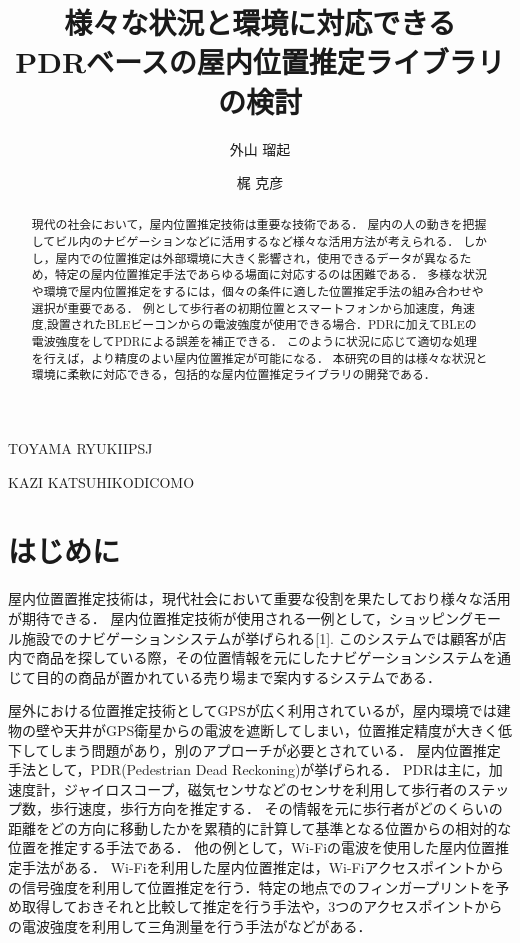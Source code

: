 \documentclass[Japanese]{dicomopapers}
\begin{document}
\title{様々な状況と環境に対応できる\\PDRベースの屋内位置推定ライブラリの検討}


\author{外山 瑠起}{TOYAMA RYUKI}{IPSJ}
\author{梶 克彦}{KAZI KATSUHIKO}{DICOMO}

\begin{abstract}
	現代の社会において，屋内位置推定技術は重要な技術である．
	屋内の人の動きを把握してビル内のナビゲーションなどに活用するなど様々な活用方法が考えられる．
	しかし，屋内での位置推定は外部環境に大きく影響され，使用できるデータが異なるため，特定の屋内位置推定手法であらゆる場面に対応するのは困難である．
	多様な状況や環境で屋内位置推定をするには，個々の条件に適した位置推定手法の組み合わせや選択が重要である．
	例として歩行者の初期位置とスマートフォンから加速度，角速度,設置されたBLEビーコンからの電波強度が使用できる場合．PDRに加えてBLEの電波強度をしてPDRによる誤差を補正できる．
	このように状況に応じて適切な処理を行えば，より精度のよい屋内位置推定が可能になる．
	本研究の目的は様々な状況と環境に柔軟に対応できる，包括的な屋内位置推定ライブラリの開発である．
\end{abstract}

\maketitle

\section{はじめに}
屋内位置置推定技術は，現代社会において重要な役割を果たしており様々な活用が期待できる．
屋内位置推定技術が使用される一例として，ショッピングモール施設でのナビゲーションシステムが挙げられる[1].
このシステムでは顧客が店内で商品を探している際，その位置情報を元にしたナビゲーションシステムを通じて目的の商品が置かれている売り場まで案内するシステムである．

屋外における位置推定技術としてGPSが広く利用されているが，屋内環境では建物の壁や天井がGPS衛星からの電波を遮断してしまい，位置推定精度が大きく低下してしまう問題があり，別のアプローチが必要とされている．
屋内位置推定手法として，PDR(Pedestrian Dead Reckoning)が挙げられる．
PDRは主に，加速度計，ジャイロスコープ，磁気センサなどのセンサを利用して歩行者のステップ数，歩行速度，歩行方向を推定する．
その情報を元に歩行者がどのくらいの距離をどの方向に移動したかを累積的に計算して基準となる位置からの相対的な位置を推定する手法である．
他の例として，Wi-Fiの電波を使用した屋内位置推定手法がある．
Wi-Fiを利用した屋内位置推定は，Wi-Fiアクセスポイントからの信号強度を利用して位置推定を行う．特定の地点でのフィンガープリントを予め取得しておきそれと比較して推定を行う手法や，3つのアクセスポイントからの電波強度を利用して三角測量を行う手法がなどがある．
\end{document}
